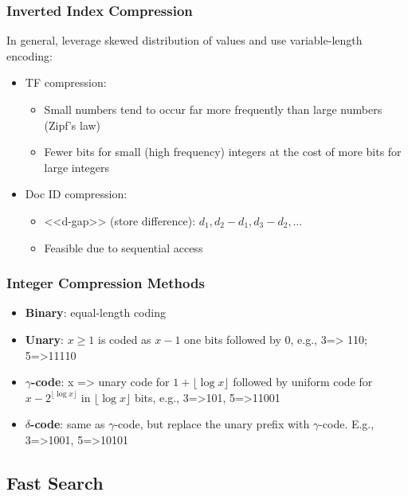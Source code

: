 \subsubsection{Inverted Index Compression}

In general, leverage skewed distribution of values and use variable-length encoding:
\begin{itemize}
\item TF compression:
\begin{itemize}
\item Small numbers tend to occur far more frequently than large
numbers (Zipf's law)
\item Fewer bits for small (high frequency) integers at the cost of more bits for large integers
\end{itemize}

\item Doc ID compression:
\begin{itemize}
\item <<d-gap>> (store difference): $d_1, d_2-d_1, d_3-d_2, \dots$
\item Feasible due to sequential access
\end{itemize}
\end{itemize}

\subsubsection{Integer Compression Methods}
\begin{itemize}
\item \textbf{Binary}: equal-length coding
\item \textbf{Unary}: $x \geqslant 1$ is coded as $x-1$ one bits followed by 0, e.g.,
3=> 110; 5=>11110
\item \textbf{$\gamma$-code}: x => unary code for $1+\lfloor \log x \rfloor$ followed by uniform code for $x-2^{\lfloor \log x \rfloor}$ in $\lfloor \log x \rfloor$ bits, e.g., 3=>101, 5=>11001
\item \textbf{$\delta$-code}: same as $\gamma$-code, but replace the unary prefix with $\gamma$-code. E.g., 3=>1001, 5=>10101
\end{itemize}

\subsection{Fast Search}
